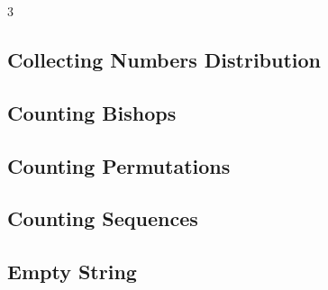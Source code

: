 \documentclass[8pt]{extarticle}
\begin{document}
\begin{multicols*}{3}
\subsection{Collecting Numbers Distribution}
\begin{caixaenunciado}

\end{caixaenunciado}
\vspace{0.3cm}


\subsection{Counting Bishops}
\begin{caixaenunciado}

\end{caixaenunciado}
\vspace{0.3cm}


\subsection{Counting Permutations}
\begin{caixaenunciado}

\end{caixaenunciado}
\vspace{0.3cm}


\subsection{Counting Sequences}
\begin{caixaenunciado}

\end{caixaenunciado}
\vspace{0.3cm}


\subsection{Empty String}
\begin{caixaenunciado}

\end{caixaenunciado}
\vspace{0.3cm}



\end{multicols*}
\end{document}
